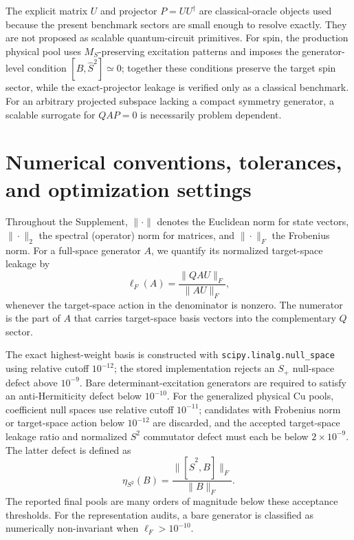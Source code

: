 \documentclass[
 aip,
 jcp,
 amsmath,amssymb,
 preprint
]{revtex4-2}
\begin{document}
The explicit matrix $U$ and projector $P=UU^\dagger$ are classical-oracle objects used because the present benchmark sectors are small enough to resolve exactly.
They are not proposed as scalable quantum-circuit primitives.
For spin, the production physical pool uses $M_S$-preserving excitation patterns and imposes the generator-level condition $[B,\hat S^2]\simeq0$; together these conditions preserve the target spin sector, while the exact-projector leakage is verified only as a classical benchmark.
For an arbitrary projected subspace lacking a compact symmetry generator, a scalable surrogate for $QAP=0$ is necessarily problem dependent.

\section{Numerical conventions, tolerances, and optimization settings}

Throughout the Supplement, $\|\cdot\|$ denotes the Euclidean norm for state vectors, $\|\cdot\|_2$ the spectral (operator) norm for matrices, and $\|\cdot\|_F$ the Frobenius norm.
For a full-space generator $A$, we quantify its normalized target-space leakage by
\begin{equation}
\ell_F(A)
=
\frac{\|QAU\|_F}{\|AU\|_F},
\end{equation}
whenever the target-space action in the denominator is nonzero.
The numerator is the part of $A$ that carries target-space basis vectors into the complementary $Q$ sector.

The exact highest-weight basis is constructed with \texttt{scipy.linalg.null\_space} using relative cutoff $10^{-12}$; the stored implementation rejects an $S_+$ null-space defect above $10^{-9}$.
Bare determinant-excitation generators are required to satisfy an anti-Hermiticity defect below $10^{-10}$.
For the generalized physical Cu pools, coefficient null spaces use relative cutoff $10^{-11}$; candidates with Frobenius norm or target-space action below $10^{-12}$ are discarded, and the accepted target-space leakage ratio and normalized $S^2$ commutator defect must each be below $2\times10^{-9}$.
The latter defect is defined as
\begin{equation}
\eta_{S^2}(B)=\frac{\|[\hat S^2,B]\|_F}{\|B\|_F}.
\end{equation}
The reported final pools are many orders of magnitude below these acceptance thresholds.
For the representation audits, a bare generator is classified as numerically non-invariant when $\ell_F>10^{-10}$.
\end{document}
